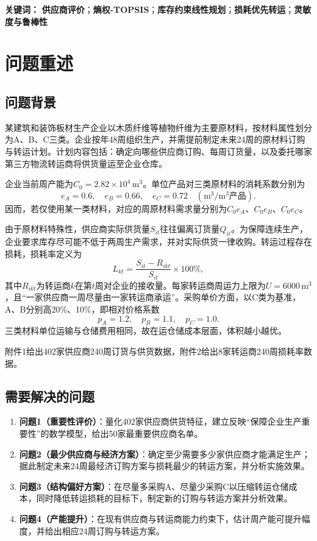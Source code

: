 \documentclass[12pt,a4paper]{ctexart}
\begin{document}
\noindent\textbf{关键词：} \textbf{供应商评价}；\textbf{熵权-TOPSIS}；\textbf{库存约束线性规划}；\textbf{损耗优先转运}；\textbf{灵敏度与鲁棒性}

\section{问题重述}

\subsection{问题背景}
某建筑和装饰板材生产企业以木质纤维等植物纤维为主要原材料，按材料属性划分为A、B、C三类。企业按年48周组织生产，并需提前制定未来24周的原材料订购与转运计划。计划内容包括：确定向哪些供应商订购、每周订货量，以及委托哪家第三方物流转运商将供货量运至企业仓库。

企业当前周产能为$C_0=2.82\times10^4\,\mathrm{m}^3$。单位产品对三类原材料的消耗系数分别为
\begin{equation}
e_A=0.6,\quad e_B=0.66,\quad e_C=0.72\quad(\mathrm{m}^3/\mathrm{m}^3\text{产品}).
\end{equation}
因而，若仅使用某一类材料，对应的周原材料需求量分别为$C_0e_A$、$C_0e_B$、$C_0e_C$。

由于原材料特殊性，供应商实际供货量$S_{it}$往往偏离订货量$Q_{it}$。为保障连续生产，企业要求库存尽可能不低于两周生产需求，并对实际供货一律收购。转运过程存在损耗，损耗率定义为
\begin{equation}
L_{kt}=\frac{S_{it}-R_{ikt}}{S_{it}}\times100\%,
\end{equation}
其中$R_{ikt}$为转运商$k$在第$t$周对企业的接收量。每家转运商周运力上限为$U=6000\,\mathrm{m}^3$，且“一家供应商一周尽量由一家转运商承运”。采购单价方面，以C类为基准，A、B分别高20\%、10\%，即相对价格系数
\begin{equation}
p_A=1.2,\quad p_B=1.1,\quad p_C=1.0.
\end{equation}
三类材料单位运输与仓储费用相同，故在运仓储成本层面，体积越小越优。

附件1给出402家供应商240周订货与供货数据，附件2给出8家转运商240周损耗率数据。

\subsection{需要解决的问题}
\begin{enumerate}[leftmargin=2em,itemsep=0.3em]
\item \textbf{问题1（重要性评价）}：量化402家供应商供货特征，建立反映“保障企业生产重要性”的数学模型，给出50家最重要供应商名单。
\item \textbf{问题2（最少供应商与经济方案）}：确定至少需要多少家供应商才能满足生产；据此制定未来24周最经济订购方案与损耗最少的转运方案，并分析实施效果。
\item \textbf{问题3（结构偏好方案）}：在尽量多采购A、尽量少采购C以压缩转运仓储成本，同时降低转运损耗的目标下，制定新的订购与转运方案并分析效果。
\item \textbf{问题4（产能提升）}：在现有供应商与转运商能力约束下，估计周产能可提升幅度，并给出相应24周订购与转运方案。
\end{enumerate}
\end{document}
